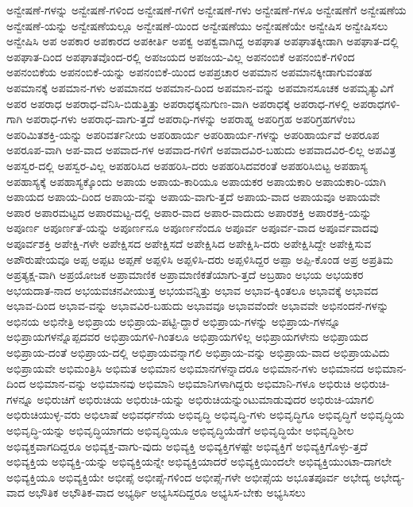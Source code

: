{ಅನ್ವೇಷಣೆ-ಗಳನ್ನು
ಅನ್ವೇಷಣೆ-ಗಳಿಂದ
ಅನ್ವೇಷಣೆ-ಗಳಿಗೆ
ಅನ್ವೇಷಣೆ-ಗಳು
ಅನ್ವೇಷಣೆ-ಗಳೂ
ಅನ್ವೇಷಣೆಗೆ
ಅನ್ವೇಷಣೆಯ
ಅನ್ವೇಷಣೆ-ಯನ್ನು
ಅನ್ವೇಷಣೆಯಲ್ಲೂ
ಅನ್ವೇಷಣೆ-ಯಿಂದ
ಅನ್ವೇಷಣೆಯು
ಅನ್ವೇಷಣೆಯೇ
ಅನ್ವೇಷಿಸ
ಅನ್ವೇಷಿಸಲು
ಅನ್ವೇಷಿಸಿ
ಅಪ
ಅಪಕಾರ
ಅಪಕಾರದ
ಅಪಕೀರ್ತಿ
ಅಪಕ್ವ
ಅಪಕ್ವವಾಗಿದ್ದ
ಅಪಘಾತ
ಅಪಘಾತಕ್ಕೀಡಾಗಿ
ಅಪಘಾತ-ದಲ್ಲಿ
ಅಪಘಾತ-ದಿಂದ
ಅಪಘಾತವೊಂದ-ರಲ್ಲಿ
ಅಪಜಯದ
ಅಪಜಯ-ವಿಲ್ಲ
ಅಪನಂಬಿಕೆ
ಅಪನಂಬಿಕೆ-ಗಳಿಂದ
ಅಪನಂಬಿಕೆಯ
ಅಪನಂಬಿಕೆ-ಯನ್ನು
ಅಪನಂಬಿಕೆ-ಯಿಂದ
ಅಪಪ್ರಚಾರ
ಅಪಮಾನ
ಅಪಮಾನಕ್ಕೀಡಾಗುವಂತಹ
ಅಪಮಾನಕ್ಕೆ
ಅಪಮಾನ-ಗಳು
ಅಪಮಾನದ
ಅಪಮಾನ-ದಿಂದ
ಅಪಮಾನ-ವನ್ನು
ಅಪಮಾನಸೂಚಕ
ಅಪಮೃತ್ಯುವಿಗೆ
ಅಪರ
ಅಪರಾಧ
ಅಪರಾಧ-ವೆನಿಸಿ-ಬಿಡುತ್ತಿತ್ತು
ಅಪರಾಧಕ್ಕನುಗುಣ-ವಾಗಿ
ಅಪರಾಧಕ್ಕೆ
ಅಪರಾಧ-ಗಳಲ್ಲಿ
ಅಪರಾಧಗಳಿ-ಗಾಗಿ
ಅಪರಾಧ-ಗಳು
ಅಪರಾಧ-ವಾಗು-ತ್ತದೆ
ಅಪರಾಧಿ-ಗಳನ್ನು
ಅಪರಾಹ್ನ
ಅಪರಿಗ್ರಹ
ಅಪರಿಗ್ರಹಗಳೆಂಬ
ಅಪರಿಮಿತಶಕ್ತಿ-ಯನ್ನು
ಅಪರಿವರ್ತನೀಯ
ಅಪರಿಹಾರ್ಯ
ಅಪರಿಹಾರ್ಯ-ಗಳನ್ನು
ಅಪರಿಹಾರ್ಯವೆ
ಅಪರೂಪ
ಅಪರೂಪ-ವಾಗಿ
ಅಪ-ವಾದ
ಅಪವಾದ-ಗಳ
ಅಪವಾದ-ಗಳಿಗೆ
ಅಪವಾದವಿರ-ಬಹುದು
ಅಪವಾದವಿರ-ಲಿಲ್ಲ
ಅಪವಿತ್ರ
ಅಪಸ್ವರ-ದಲ್ಲಿ
ಅಪಸ್ವರ-ವಿಲ್ಲ
ಅಪಹರಿಸಿದ
ಅಪಹರಿಸಿ-ದರು
ಅಪಹರಿಸಿದವರಂತೆ
ಅಪಹರಿಸಿಬಿಟ್ಟ
ಅಪಹಾಸ್ಯ
ಅಪಹಾಸ್ಯಕ್ಕೆ
ಅಪಹಾಸ್ಯಕ್ಕೊಂದು
ಅಪಾಯ
ಅಪಾಯ-ಕಾರಿಯೂ
ಅಪಾಯಕರ
ಅಪಾಯಕಾರಿ
ಅಪಾಯಕಾರಿ-ಯಾಗಿ
ಅಪಾಯದ
ಅಪಾಯ-ದಿಂದ
ಅಪಾಯ-ವನ್ನು
ಅಪಾಯ-ವಾಗು-ತ್ತದೆ
ಅಪಾಯ-ವಾದ
ಅಪಾಯವೂ
ಅಪಾಯವೇ
ಅಪಾರ
ಅಪಾರಮಟ್ಟದ
ಅಪಾರಮಟ್ಟ-ದಲ್ಲಿ
ಅಪಾರ-ವಾದ
ಅಪಾರ-ವಾದುದು
ಅಪಾರಶಕ್ತಿ
ಅಪಾರಶಕ್ತಿ-ಯನ್ನು
ಅಪೂರ್ಣ
ಅಪೂರ್ಣತೆ-ಯನ್ನು
ಅಪೂರ್ಣನೂ
ಅಪೂರ್ಣನೆಂದೂ
ಅಪೂರ್ವ
ಅಪೂರ್ವ-ವಾದ
ಅಪೂರ್ವವಾದವು
ಅಪೂರ್ವಶಕ್ತಿ
ಅಪೇಕ್ಷಿ-ಗಳೇ
ಅಪೇಕ್ಷಿಸದ
ಅಪೇಕ್ಷಿಸದೆ
ಅಪೇಕ್ಷಿಸಿದ
ಅಪೇಕ್ಷಿಸಿ-ದರು
ಅಪೇಕ್ಷಿಸಿದ್ದೇ
ಅಪೇಕ್ಷಿಸುವ
ಅಪೌರುಷೇಯವೂ
ಅಪ್ಪ
ಅಪ್ಪಟ
ಅಪ್ಪಣೆ
ಅಪ್ಪಳಿಸಿ
ಅಪ್ಪಳಿಸಿ-ದರು
ಅಪ್ಪಳಿಸಿದ್ದರ
ಅಪ್ಪಾ
ಅಪ್ಪಿ-ಕೊಂಡ
ಅಪ್ರ
ಅಪ್ರತಿಮ
ಅಪ್ರತ್ಯಕ್ಷ-ವಾಗಿ
ಅಪ್ರಯೋಜಕ
ಅಪ್ರಾಮಾಣಿಕ
ಅಪ್ರಾಮಾಣಿಕತೆಯಾಗು-ತ್ತದೆ
ಅಬ್ರಹಾಂ
ಅಭಯ
ಅಭಯಕರ
ಅಭಯದಾತ-ನಾದ
ಅಭಯವಚನವೀಯುತ್ತ
ಅಭಯವನ್ನಿತ್ತು
ಅಭಾವ
ಅಭಾವ-ಕ್ಕಿಂತಲೂ
ಅಭಾವಕ್ಕೆ
ಅಭಾವದ
ಅಭಾವ-ದಿಂದ
ಅಭಾವ-ವನ್ನು
ಅಭಾವವಿರ-ಬಹುದು
ಅಭಾವವೂ
ಅಭಾವವೆಂದೇ
ಅಭಾವವೇ
ಅಭಿನಂದನೆ-ಗಳನ್ನು
ಅಭಿನಯ
ಅಭಿನೇತ್ರಿ
ಅಭಿಪ್ರಾಯ
ಅಭಿಪ್ರಾಯ-ಪಟ್ಟಿ-ದ್ದಾರೆ
ಅಭಿಪ್ರಾಯ-ಗಳನ್ನು
ಅಭಿಪ್ರಾಯ-ಗಳನ್ನೂ
ಅಭಿಪ್ರಾಯಗಳನ್ನೊಪ್ಪದವರ
ಅಭಿಪ್ರಾಯಗಳಿ-ಗಿಂತಲೂ
ಅಭಿಪ್ರಾಯಗಳಿಲ್ಲ
ಅಭಿಪ್ರಾಯಗಳೇನು
ಅಭಿಪ್ರಾಯದ
ಅಭಿಪ್ರಾಯ-ದಂತೆ
ಅಭಿಪ್ರಾಯ-ದಲ್ಲಿ
ಅಭಿಪ್ರಾಯವನ್ನಾಗಲಿ
ಅಭಿಪ್ರಾಯ-ವನ್ನು
ಅಭಿಪ್ರಾಯ-ವಾದ
ಅಭಿಪ್ರಾಯವಿದು
ಅಭಿಪ್ರಾಯವೇ
ಅಭಿಮಂತ್ರಿಸಿ
ಅಭಿಮತ
ಅಭಿಮಾನ
ಅಭಿಮಾನಗಳನ್ನಾದರೂ
ಅಭಿಮಾನ-ಗಳು
ಅಭಿಮಾನದ
ಅಭಿಮಾನ-ದಿಂದ
ಅಭಿಮಾನ-ವನ್ನು
ಅಭಿಮಾನವು
ಅಭಿಮಾನಿ
ಅಭಿಮಾನಿಗಳಾಗಿದ್ದರು
ಅಭಿಮಾನಿ-ಗಳೂ
ಅಭಿರುಚಿ
ಅಭಿರುಚಿ-ಗಳನ್ನೂ
ಅಭಿರುಚಿಗೆ
ಅಭಿರುಚಿಯ
ಅಭಿರುಚಿ-ಯನ್ನು
ಅಭಿರುಚಿಯನ್ನುಂಟುಮಾಡುವುದರ
ಅಭಿರುಚಿ-ಯಾಗಲಿ
ಅಭಿರುಚಿಯುಳ್ಳ-ವರು
ಅಭಿಲಾಷೆ
ಅಭಿವರ್ಧನೆಯ
ಅಭಿವೃದ್ಧಿ
ಅಭಿವೃದ್ಧಿ-ಗಳು
ಅಭಿವೃದ್ಧಿಗೂ
ಅಭಿವೃದ್ಧಿಗೆ
ಅಭಿವೃದ್ಧಿಯ
ಅಭಿವೃದ್ಧಿ-ಯನ್ನು
ಅಭಿವೃದ್ಧಿಯಾಗದು
ಅಭಿವೃದ್ಧಿಯೂ
ಅಭಿವೃದ್ಧಿಯೆಡೆಗೆ
ಅಭಿವೃದ್ಧಿಯೇ
ಅಭಿವೃದ್ಧಿಶೀಲ
ಅಭಿವ್ಯಕ್ತವಾಗದಿದ್ದರೂ
ಅಭಿವ್ಯಕ್ತ-ವಾಗು-ವುದು
ಅಭಿವ್ಯಕ್ತಿ
ಅಭಿವ್ಯಕ್ತಿಗಳಷ್ಟೇ
ಅಭಿವ್ಯಕ್ತಿಗೆ
ಅಭಿವ್ಯಕ್ತಿಗೊಳ್ಳು-ತ್ತದೆ
ಅಭಿವ್ಯಕ್ತಿಯ
ಅಭಿವ್ಯಕ್ತಿ-ಯನ್ನು
ಅಭಿವ್ಯಕ್ತಿಯನ್ನೇ
ಅಭಿವ್ಯಕ್ತಿಯಾದರೆ
ಅಭಿವ್ಯಕ್ತಿಯಿಂದಲೇ
ಅಭಿವ್ಯಕ್ತಿಯುಂಟಾ-ದಾಗಲೇ
ಅಭಿವ್ಯಕ್ತಿಯೂ
ಅಭಿವ್ಯಕ್ತಿಯೇ
ಅಭೀಪ್ಸೆ
ಅಭೀಪ್ಸೆ-ಗಳಿಂದ
ಅಭೀಪ್ಸೆ-ಗಳೇ
ಅಭೀಪ್ಸೆಯ
ಅಭೂತಪೂರ್ವ
ಅಭೇದ್ಯ
ಅಭೇದ್ಯ-ವಾದ
ಅಭೌತಿಕ
ಅಭೌತಿಕ-ವಾದ
ಅಭ್ಯರ್ಥಿ
ಅಭ್ಯಸಿಸದಿದ್ದರೂ
ಅಭ್ಯಸಿಸ-ಬೇಕು
ಅಭ್ಯಸಿಸಲು
}
